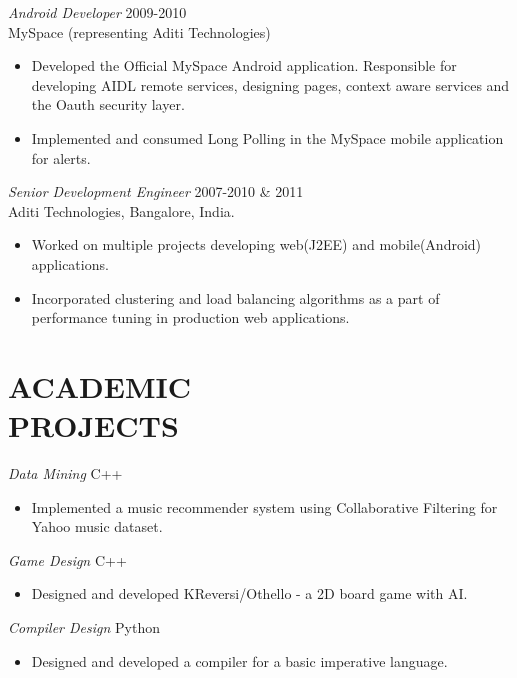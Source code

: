 \documentclass[line,margin]{res}
\begin{document}
\begin{resume}
                {\sl Android Developer} \hfill            2009-2010 \\
                MySpace (representing Aditi Technologies) 
                 \begin{itemize}  \itemsep -2pt %
                 \item Developed the Official MySpace Android application. Responsible for developing AIDL
remote services, designing pages, context aware services and the Oauth security layer. 
 \item Implemented and consumed Long Polling in the MySpace mobile application for alerts.
                 \end{itemize} 
                {\sl Senior Development Engineer} \hfill        2007-2010 \& 2011 \\
                Aditi Technologies, Bangalore, India.
                  \begin{itemize}
                   \item Worked on multiple projects developing web(J2EE) and mobile(Android) applications.
                    \item Incorporated clustering and load balancing algorithms as a part of performance tuning in production web applications. 
                   \end{itemize} 

 
\section{ACADEMIC \\ PROJECTS}  {\sl Data Mining} \hfill        C++
                 \begin{itemize}  \itemsep -2pt %
                 \item Implemented a music recommender system using Collaborative Filtering for Yahoo music dataset.
                 \end{itemize} 
                {\sl Game Design}  \hfill        C++
                  \begin{itemize} \itemsep -2pt
                   \item Designed and developed KReversi/Othello - a 2D board game with AI.        
                   \end{itemize} 
                   {\sl Compiler Design}  \hfill        Python
                  \begin{itemize} \itemsep -2pt
                   \item Designed and developed a compiler for a basic imperative language.       
                   \end{itemize}
 

\end{resume}
\end{document}
